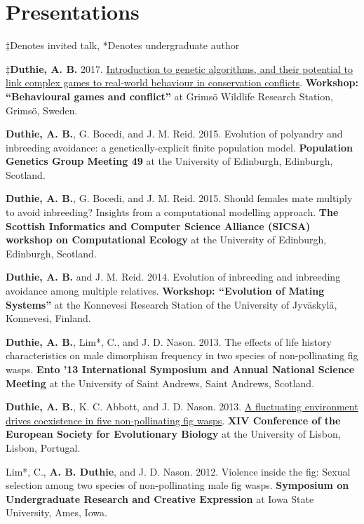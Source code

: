 \documentclass[letterpaper]{article}
\renewenvironment{itemize}{
  \begin{list}{}{
    \setlength{\leftmargin}{1.5em}
  }
}{
  \end{list}
}
\begin{document}
\section*{Presentations}
\begin{itemize}
\item $\ddagger$Denotes invited talk, *Denotes undergraduate author
\item $\ddagger${\bf Duthie, A. B.} 2017. \href{https://bradduthie.shinyapps.io/GRIMSO}{Introduction to genetic algorithms, and their potential to link complex games to real-world behaviour in conservation conflicts}. {\bf Workshop: ``Behavioural games and conflict''} at Grims\"{o} Wildlife Research Station, Grims\"{o}, Sweden.
\item {\bf Duthie, A. B.}, G. Bocedi, and J. M. Reid. 2015. Evolution of polyandry and inbreeding avoidance: a genetically-explicit finite population model. {\bf Population Genetics Group Meeting 49} at the University of Edinburgh, Edinburgh, Scotland.
\item {\bf Duthie, A. B.}, G. Bocedi, and J. M. Reid. 2015. Should females mate multiply to avoid inbreeding? Insights from a computational modelling approach. {\bf The Scottish Informatics and Computer Science Alliance (SICSA) workshop on Computational Ecology} at the University of Edinburgh, Edinburgh, Scotland.
\item {\bf Duthie, A. B.} and J. M. Reid. 2014. Evolution of inbreeding and inbreeding avoidance among multiple relatives. {\bf Workshop: ``Evolution of Mating Systems''} at the Konnevesi Research Station of the University of Jyv\"{a}skyl\"{a}, Konnevesi, Finland.
\item {\bf Duthie, A. B.}, Lim*, C., and J. D. Nason. 2013. The effects of life history characteristics on male dimorphism frequency in two species of non-pollinating fig wasps. {\bf Ento '13 International Symposium and Annual National Science Meeting} at the University of Saint Andrews, Saint Andrews, Scotland.
\item {\bf Duthie, A. B.}, K. C. Abbott, and J. D. Nason. 2013. \href{https://www.youtube.com/watch?v=8Oi48FdaLXY}{A fluctuating environment drives coexistence in five non-pollinating fig wasps}. {\bf XIV Conference of the European Society for Evolutionary Biology} at the University of Lisbon, Lisbon, Portugal.
\item Lim*, C., {\bf A. B. Duthie}, and J. D. Nason. 2012. Violence inside the fig: Sexual selection among two species of non-pollinating male fig wasps. {\bf Symposium on Undergraduate Research and Creative Expression} at Iowa State University, Ames, Iowa.

\end{itemize}
\end{document}
